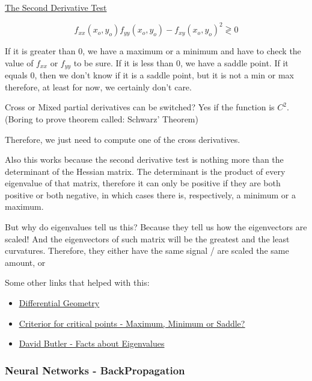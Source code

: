 \ul{The Second Derivative Test}

\begin{equation}
    f_{xx}(x_o, y_o) f_{yy}(x_o, y_o) - f_{xy}(x_o, y_o)^2 \gtrless 0
\end{equation}

If it is greater than 0, we have a maximum or a minimum and have to check the value of $f_{xx}$ or $f_{yy}$ to be sure. If it is less than 0, we have a saddle point. If it equals 0, then we don't know if it is a saddle point, but it is not a min or max therefore, at least for now, we certainly don't care.

Cross or Mixed partial derivatives can be switched? Yes if the function is $C^2$. 
(Boring to prove theorem called: Schwarz' Theorem)

Therefore, we just need to compute one of the cross derivatives.


Also this works because the second derivative test is nothing more than the determinant of the Hessian matrix. The determinant is the product of every eigenvalue of that matrix, therefore it can only be positive if they are both positive or both negative, in which cases there is, respectively, a minimum or a maximum. 

But why do eigenvalues tell us this? Because they tell us how the eigenvectors are scaled! And the eigenvectors of such matrix will be the greatest and the least curvatures. Therefore, they either have the same signal / are scaled the same amount, or 



Some other links that helped with this:
\begin{itemize}
    \item \href{http://homepages.inf.ed.ac.uk/rbf/CVonline/LOCAL_COPIES/MORSE/diffgeom.pdf}{\ul{Differential Geometry}}
    \item \href{http://math.mit.edu/classes/18.013A/HTML/chapter11/section02.html}{\ul{Criterior for critical points - Maximum, Minimum or Saddle?}}
    \item \href{https://www.adelaide.edu.au/mathslearning/play/seminars/evalue-magic-tricks-handout.pdf}{David Butler - Facts about Eigenvalues}
\end{itemize}





\subsubsection{Neural Networks - BackPropagation}

